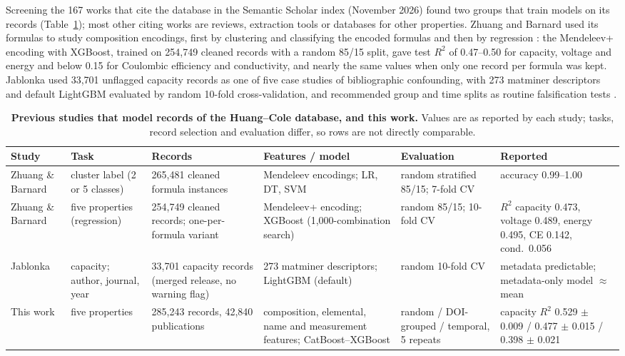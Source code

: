 \documentclass[journal=jcisd8,manuscript=article,layout=traditional]{achemso}
\begin{document}
Screening the 167 works that cite the database in the Semantic Scholar index (November 2026) found two groups that train models on its records (Table~\ref{tab:previous}); most other citing works are reviews, extraction tools or databases for other properties. Zhuang and Barnard used its formulas to study composition encodings, first by clustering and classifying the encoded formulas \cite{zhuang2023mendeleev,zhuang2024classification,zhuang2025applications} and then by regression \cite{zhuang2024property}: the Mendeleev+ encoding with XGBoost, trained on 254,749 cleaned records with a random 85/15 split, gave test $R^2$ of 0.47--0.50 for capacity, voltage and energy and below 0.15 for Coulombic efficiency and conductivity, and nearly the same values when only one record per formula was kept. Jablonka used 33,701 unflagged capacity records as one of five case studies of bibliographic confounding, with 273 matminer descriptors \cite{ward2018matminer,ward2016magpie,meredig2014combinatorial} and default LightGBM \cite{ke2017lightgbm} evaluated by random 10-fold cross-validation, and recommended group and time splits as routine falsification tests \cite{jablonka2026clever}.

\begin{table}[htbp]
    \centering\small
    \caption{\textbf{Previous studies that model records of the Huang--Cole database, and this work.} Values are as reported by each study; tasks, record selection and evaluation differ, so rows are not directly comparable.}
    \label{tab:previous}
    \begin{adjustbox}{max width=\textwidth}
    \begin{tabular}{@{}p{2.6cm} p{2.6cm} p{3.0cm} p{2.4cm} p{2.6cm} p{2.2cm}@{}}
        \toprule
        Study & Task & Records & Features / model & Evaluation & Reported \\
        \midrule
        Zhuang \& Barnard \cite{zhuang2024classification} & cluster label (2 or 5 classes) & 265,481 cleaned formula instances & Mendeleev encodings; LR, DT, SVM & random stratified 85/15; 7-fold CV & accuracy 0.99--1.00 \\
        Zhuang \& Barnard \cite{zhuang2024property} & five properties (regression) & 254,749 cleaned records; one-per-formula variant & Mendeleev+ encoding; XGBoost (1,000-combination search) & random 85/15; 10-fold CV & $R^2$ capacity 0.473, voltage 0.489, energy 0.495, CE 0.142, cond.\ 0.056 \\
        Jablonka \cite{jablonka2026clever} & capacity; author, journal, year & 33,701 capacity records (merged release, no warning flag) & 273 matminer descriptors; LightGBM (default) & random 10-fold CV & metadata predictable; metadata-only model $\approx$ mean \\
        \midrule
        This work & five properties & 285,243 records, 42,840 publications & composition, elemental, name and measurement features; CatBoost--XGBoost & random / DOI-grouped / temporal, 5 repeats & capacity $R^2$ 0.529 $\pm$ 0.009 / 0.477 $\pm$ 0.015 / 0.398 $\pm$ 0.021 \\
        \bottomrule
    \end{tabular}
    \end{adjustbox}
\end{table}
\end{document}
